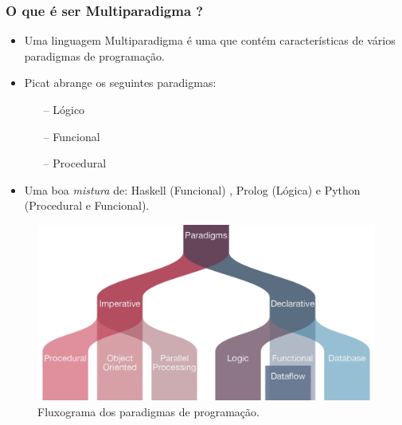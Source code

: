 
\begin{frame}[fragile]
    \frametitle{O que é ser Multiparadigma ?}

    \begin{itemize}
    
      \item Uma linguagem Multiparadigma é uma que contém características  de vários paradigmas de 
      programação.
      
      \item Picat abrange os seguintes paradigmas:
      
      \begin{itemize}
      	\item[--] Lógico
      	\item[--] Funcional
      	\item[--] Procedural
      \end{itemize}
      
      \item Uma boa \textit{mistura} de: Haskell (Funcional) , Prolog (Lógica) e 
      Python (Procedural e Funcional).
      
    \end{itemize}
      
      \begin{figure}
        \centering
        \includegraphics[width=.5\textwidth] {figures/Paradigma_Flow.png}
        \caption{Fluxograma dos paradigmas de programação.}
        \label{Fluxograma dos Paradigmas}
      \end{figure}
      

\end{frame}

